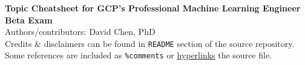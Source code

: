\documentclass[10pt,landscape,letterpaper]{cheatsheet}
\begin{document}
\begin{center}
  {\Large\sffamily\bfseries Topic Cheatsheet for GCP's Professional Machine Learning Engineer Beta Exam}  \\
  {\small Authors/contributors: David Chen, PhD} \\
  {\tiny Credits \& disclaimers can be found in \texttt{README} section of the source repository. Some references are included as \texttt{\%comments} or \href{github.com/ydavidchen/gcp-mle-outline}{hyperlinks} the \LaTex source file.}
\end{center}

\footnotesize
\setlength{\premulticols}{0pt}
\setlength{\postmulticols}{0pt}
\setlength{\multicolsep}{1pt}
\setlength{\columnsep}{1.8em}
\end{document}
